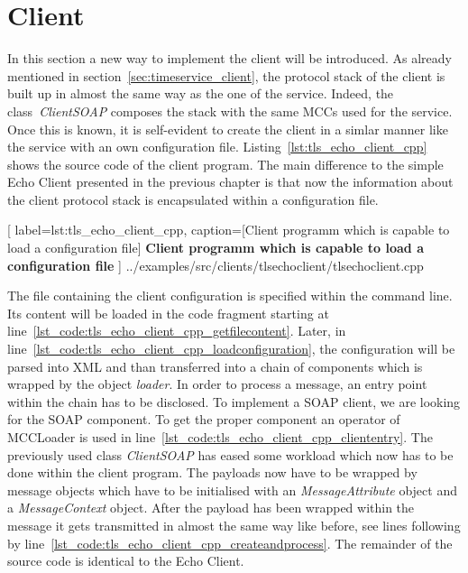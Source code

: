 \clearpage
\section{Client}

In this section a new way to implement the client will be introduced. As already mentioned in section~\ref{sec:timeservice_client}, the protocol stack of the client is built up in almost the same way as the one of the service. Indeed, the class~\textit{ClientSOAP} composes the stack with the same MCCs used for the service. Once this is known, it is self-evident to create the client in a simlar manner like the service with an own configuration file.
Listing~\ref{lst:tls_echo_client_cpp} shows the source code of the client program. The main difference to the simple Echo Client presented in the previous chapter is that now the information about the client protocol stack is encapsulated within a configuration file.\\

	[
	label=lst:tls_echo_client_cpp,
	caption={[Client programm which is capable to load a configuration file]
	\textbf{Client programm which is capable to load a configuration file}}
	]
{../examples/src/clients/tlsechoclient/tlsechoclient.cpp}


The file containing the client configuration is specified within the command line. 
Its content will be loaded in the code fragment starting at line~\ref{lst_code:tls_echo_client_cpp_getfilecontent}. 
Later, in line~\ref{lst_code:tls_echo_client_cpp_loadconfiguration}, the configuration will be parsed into XML and than transferred into a chain of components which is wrapped by the object \textit{loader}. In order to process a message, an entry point within the chain has to be disclosed. To implement a SOAP client, we are looking for the SOAP component. 
To get the proper component an operator of MCCLoader is used in line~\ref{lst_code:tls_echo_client_cpp_cliententry}.
The previously used class \textit{ClientSOAP} has eased some workload which now has to be done within the client program.
The payloads now have to be wrapped by message objects which have to be initialised with an \textit{MessageAttribute} object and a \textit{MessageContext} object. After the payload has been wrapped within the message it gets transmitted in almost the same way like before, see lines following by line~\ref{lst_code:tls_echo_client_cpp_createandprocess}. The remainder of the source code is identical to the Echo Client.\\






